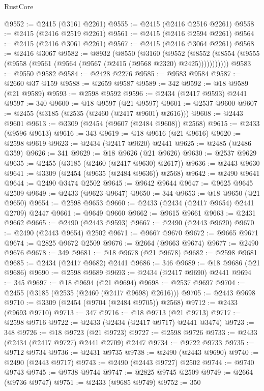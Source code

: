 \begin{lexlean}{RustCore}
\begin{coremodule}
@9552 := @2415 (@3161 @2261)
@9555 := @2415 (@2416 @2516 @2261)
@9558 := @2415 (@2416 @2519 @2261)
@9561 := @2415 (@2416 @2594 @2261)
@9564 := @2415 (@2416 @3061 @2261)
@9567 := @2415 (@2416 @3064 @2261)
@9568 := @2416 @3067
@9582 := @8932
    (@8550
      (@3160
        (@9552
          (@8552 (@8554 (@9555 (@9558 (@9561 (@9564 (@9567 (@2415 (@9568 @2320) @2425)))))))))))
@9583 := @9550 @9582
@9584 := @2428 @2276
@9585 := @9583 @9584
@9587 := @2660 @37 @159
@9588 := @2659 @9587
@9589 := 342
@9592 := @18 @9589 (@21 @9589)
@9593 := @2598 @9592
@9596 := @2434 (@2417 @9593) @2441
@9597 := 340
@9600 := @18 @9597 (@21 @9597)
@9601 := @2537 @9600
@9607 := @2455 (@3185 (@2535 (@2460 (@2417 @9601) @2616)))
@9608 := @2443 @9601
@9613 := @3309 (@2454 (@9607 (@2484 @9608)) @2568)
@9615 := @2433 (@9596 @9613)
@9616 := 343
@9619 := @18 @9616 (@21 @9616)
@9620 := @2598 @9619
@9623 := @2434 (@2417 @9620) @2441
@9625 := @2485 (@2486 @359)
@9626 := 341
@9629 := @18 @9626 (@21 @9626)
@9630 := @2537 @9629
@9635 := @2455 (@3185 (@2460 (@2417 @9630) @2617))
@9636 := @2443 @9630
@9641 := @3309 (@2454 (@9635 (@2484 @9636)) @2568)
@9642 := @2490 @9641
@9644 := @2490 @3474 @2502
@9645 := @9642 @9644
@9647 := @9625 @9645 @2509
@9649 := @2433 (@9623 @9647)
@9650 := 344
@9653 := @18 @9650 (@21 @9650)
@9654 := @2598 @9653
@9660 := @2433 (@2434 (@2417 @9654) @2441 @2709) @2447
@9661 := @9649 @9660
@9662 := @9615 @9661
@9663 := @2431 @9662
@9665 := @2490 (@2443 @9593)
@9667 := @2490 (@2443 @9620)
@9670 := @2490 (@2443 @9654) @2502
@9671 := @9667 @9670
@9672 := @9665 @9671
@9674 := @2825 @9672 @2509
@9676 := @2664 (@9663 @9674)
@9677 := @2490 @9676
@9678 := 349
@9681 := @18 @9678 (@21 @9678)
@9682 := @2598 @9681
@9685 := @2434 (@2417 @9682) @2441
@9686 := 346
@9689 := @18 @9686 (@21 @9686)
@9690 := @2598 @9689
@9693 := @2434 (@2417 @9690) @2441
@9694 := 345
@9697 := @18 @9694 (@21 @9694)
@9698 := @2537 @9697
@9704 := @2455 (@3185 (@2535 (@2460 (@2417 @9698) @2616)))
@9705 := @2443 @9698
@9710 := @3309 (@2454 (@9704 (@2484 @9705)) @2568)
@9712 := @2433 (@9693 @9710)
@9713 := 347
@9716 := @18 @9713 (@21 @9713)
@9717 := @2598 @9716
@9722 := @2433 (@2434 (@2417 @9717) @2441 @3474)
@9723 := 348
@9726 := @18 @9723 (@21 @9723)
@9727 := @2598 @9726
@9733 := @2433 (@2434 (@2417 @9727) @2441 @2709) @2447
@9734 := @9722 @9733
@9735 := @9712 @9734
@9736 := @2431 @9735
@9738 := @2490 (@2443 @9690)
@9740 := @2490 (@2443 @9717)
@9743 := @2490 (@2443 @9727) @2502
@9744 := @9740 @9743
@9745 := @9738 @9744
@9747 := @2825 @9745 @2509
@9749 := @2664 (@9736 @9747)
@9751 := @2433 (@9685 @9749)
@9752 := 350

\end{coremodule}
\end{lexlean}
